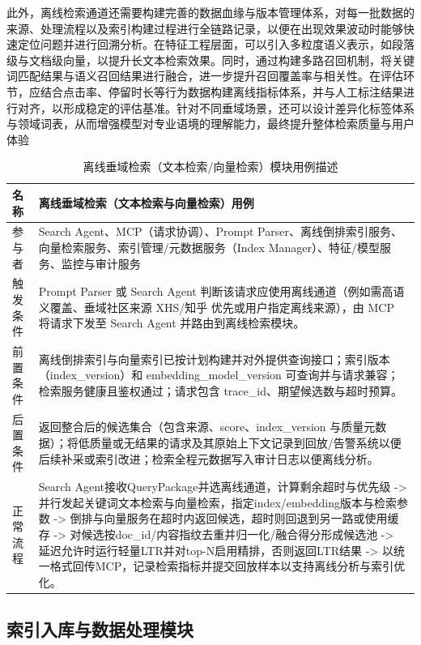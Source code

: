 此外，离线检索通道还需要构建完善的数据血缘与版本管理体系，对每一批数据的来源、处理流程以及索引构建过程进行全链路记录，以便在出现效果波动时能够快速定位问题并进行回溯分析。在特征工程层面，可以引入多粒度语义表示，如段落级与文档级向量，以提升长文本检索效果。同时，通过构建多路召回机制，将关键词匹配结果与语义召回结果进行融合，进一步提升召回覆盖率与相关性。在评估环节，应结合点击率、停留时长等行为数据构建离线指标体系，并与人工标注结果进行对齐，以形成稳定的评估基准。针对不同垂域场景，还可以设计差异化标签体系与领域词表，从而增强模型对专业语境的理解能力，最终提升整体检索质量与用户体验
\begin{table}[H]
\centering
\caption{离线垂域检索（文本检索/向量检索）模块用例描述}
\label{tab:nonperiodic-usecase}
{\renewcommand{\arraystretch}{1.}
\begin{tabular}{p{3cm} p{11cm}}
\hline
名称 & 离线垂域检索（文本检索与向量检索）用例 \\ \hline
参与者 & Search Agent、MCP（请求协调）、Prompt Parser、离线倒排索引服务、向量检索服务、索引管理/元数据服务（Index Manager）、特征/模型服务、监控与审计服务 \\ \hline
触发条件 & Prompt Parser 或 Search Agent 判断该请求应使用离线通道（例如需高语义覆盖、垂域社区来源 XHS/知乎 优先或用户指定离线来源），由 MCP 将请求下发至 Search Agent 并路由到离线检索模块。 \\ \hline
前置条件 & 离线倒排索引与向量索引已按计划构建并对外提供查询接口；索引版本（index\_version）和 embedding\_model\_version 可查询并与请求兼容；检索服务健康且鉴权通过；请求包含 trace\_id、期望候选数与超时预算。 \\ \hline
后置条件 & 返回整合后的候选集合（包含来源、score、index\_version 与质量元数据）；将低质量或无结果的请求及其原始上下文记录到回放/告警系统以便后续补采或索引改进；检索全程元数据写入审计日志以便离线分析。 \\ \hline
正常流程 &
Search Agent接收QueryPackage并选离线通道，计算剩余超时与优先级 -> 并行发起关键词文本检索与向量检索，指定index/embedding版本与检索参数 -> 倒排与向量服务在超时内返回候选，超时则回退到另一路或使用缓存 -> 对候选按doc\_id/内容指纹去重并归一化/融合得分形成候选池 -> 延迟允许时运行轻量LTR并对top-N启用精排，否则返回LTR结果 -> 以统一格式回传MCP，记录检索指标并提交回放样本以支持离线分析与索引优化。 \\
\hline
\end{tabular}
}
\end{table}
\subsection{索引入库与数据处理模块} 

